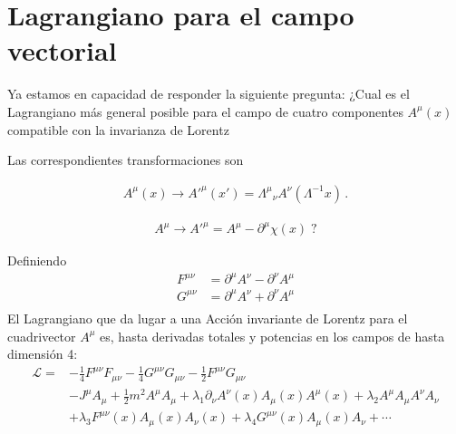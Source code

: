 \section{Lagrangiano para el campo vectorial}
\begin{frame}
Ya estamos en capacidad de responder la siguiente pregunta: ¿Cual es el Lagrangiano más general posible para el campo de cuatro componentes $A^{\mu}(x)$ compatible con la invarianza de Lorentz 

Las correspondientes transformaciones son

\begin{align}
  A^\mu(x)\to {A'}^\mu(x')={\Lambda^\mu}_\nu A^\nu(\Lambda^{-1}x)\,.
\end{align}


\begin{align}
\label{eq:172qft}
  A^\mu\to{A'}^\mu=A^\mu-\partial^\mu\chi(x)\;?
\end{align}




Definiendo
\begin{align*}
  F^{\mu\nu}&=\partial^\mu A^\nu-\partial^\nu A^\mu\\
  G^{\mu\nu}&=\partial^\mu A^\nu+\partial^\nu A^\mu\\
\end{align*}
El Lagrangiano que da lugar a una Acción invariante de Lorentz para el cuadrivector $A^\mu$
es, hasta derivadas totales y potencias en los campos de hasta dimensión 4:
\begin{align}
  \mathcal{L}=&-\frac{1}{4}F^{\mu\nu}F_{\mu\nu}-\frac{1}{4}G^{\mu\nu}G_{\mu\nu}-\frac{1}{2}F^{\mu\nu}G_{\mu\nu}\nonumber\\
&-J^\mu A_\mu+
 \frac{1}{2}m^2A^\mu A_\mu +\lambda_1\partial_\nu A^\nu(x) A_\mu(x) A^\mu(x)+\lambda_2 A^\mu A_\mu A^\nu A_\nu\nonumber\\
&+\lambda_3 F^{\mu\nu}(x)A_\mu(x) A_\nu(x)+\lambda_4G^{\mu\nu}(x)A_\mu(x) A_\nu+\cdots
  \label{eq:lagAmu}
\end{align}
\end{frame}

